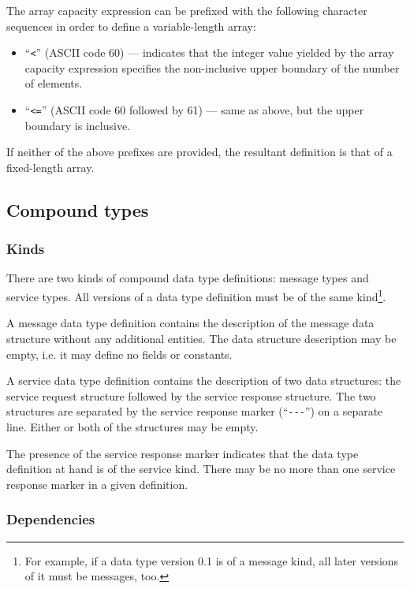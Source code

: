 The array capacity expression can be prefixed with the following character sequences in order to define
a variable-length array:
\begin{itemize}
    \item ``\verb|<|'' (ASCII code 60) --- indicates that the integer value yielded by the array capacity expression
    specifies the non-inclusive upper boundary of the number of elements.

    \item ``\verb|<=|'' (ASCII code 60 followed by 61) --- same as above, but the upper boundary is inclusive.
\end{itemize}
If neither of the above prefixes are provided, the resultant definition is that of a fixed-length array.

\subsection{Compound types}

\subsubsection{Kinds}

There are two kinds of compound data type definitions: message types and service types.
All versions of a data type definition must be of the same kind\footnote{%
For example, if a data type version 0.1 is of a message kind, all later versions of it must be messages, too.}.

A message data type definition contains the description of the message data structure without any additional entities.
The data structure description may be empty, i.e. it may define no fields or constants.

A service data type definition contains the description of two data structures:
the service request structure followed by the service response structure.
The two structures are separated by the service response marker (``\verb|---|'') on a separate line.
Either or both of the structures may be empty.

The presence of the service response marker indicates that the data type definition at hand is of the service kind.
There may be no more than one service response marker in a given definition.

\subsubsection{Dependencies}

